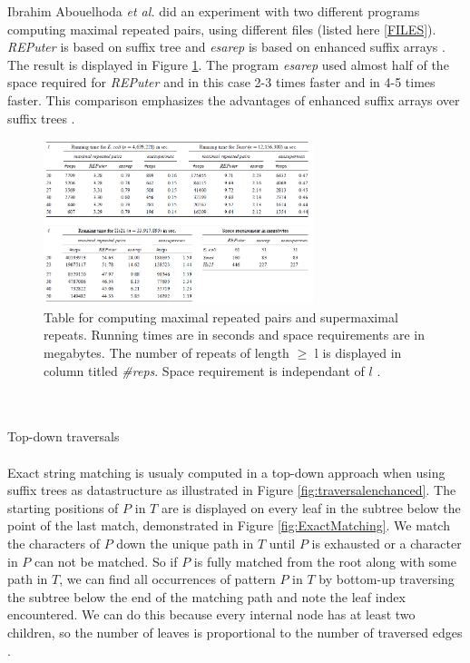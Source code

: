 \documentclass[12pt]{article} %
\begin{document}
Ibrahim Abouelhoda \emph{et al.} did an experiment with two different programs computing maximal repeated pairs, using different files (listed here \ref{FILES})\cite{enchancedsuffix}. \emph{REPuter} is based on suffix tree and \emph{esarep} is based on enhanced suffix arrays \cite{enchancedsuffix}. The result is displayed in Figure \ref{fig:ButtomUp}.
The program \emph{esarep} used almost half of the space required for \emph{REPuter} and in this case 2-3 times faster and in 4-5 times faster. This comparison emphasizes the advantages of enhanced suffix arrays over suffix trees \cite{enchancedsuffix}.
\begin{figure}[H]
    \centering
    \includegraphics[width=0.7\textwidth]{ButtomUp}
    \captionsetup{width=0.8\textwidth}
    \caption{Table for computing maximal repeated pairs and supermaximal repeats. Running times are in seconds and space requirements are in megabytes. The number of repeats of length $\geq$ l is displayed in column titled \emph{\#reps}. Space requirement is independant of $l$ \cite{enchancedsuffix}.}
    \label{fig:ButtomUp}
\end{figure}
\\ \\
Top-down traversals
\\ \\
Exact string matching is usualy computed in a top-down approach when using suffix trees as datastructure as illustrated in Figure \ref{fig:traversalenchanced}.
The starting positions of $P$ in $T$ are is displayed on every leaf in the subtree below the point of the last match, demonstrated in Figure \ref{fig:ExactMatching}. We match the characters of $P$ down the unique path in $T$ until $P$ is exhausted or a character in $P$ can not be matched. So if $P$ is fully matched from the root along with some path in $T$, we can find all occurrences of pattern $P$ in $T$ by bottom-up traversing the subtree below the end of the matching path and note the leaf index encountered. We can do this because every internal node has at least two children, so the number of leaves is proportional to the number of traversed edges \cite{gusfield}.
\end{document}
